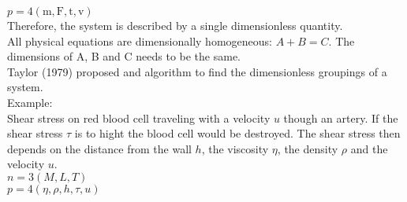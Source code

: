 \documentclass[hyperref]{labbook}
\numberwithin{equation}{experiment}
\numberwithin{table}{experiment}
\numberwithin{figure}{experiment}
\begin{document}
$p = 4 (\mathrm{m,F,t,v})$\\
Therefore, the system is described by a single dimensionless quantity.\\[1em]
All physical equations are dimensionally homogeneous: $A + B = C $. The dimensions of A, B and C needs to be the same. \\[1em]
Taylor (1979) proposed and algorithm to find the dimensionless groupings of a system. \\
Example:\\
Shear stress on red blood cell traveling with a velocity $u$ though an artery. If the shear stress $\tau$ is to hight the blood cell would be destroyed. The shear stress then depends on the distance from the wall $h$, the viscosity $\eta$, the density $\rho$ and the velocity $u$.\\[1em]
$n = 3 (M,L,T)$\\
$p = 4 (\eta,\rho,h,\tau,u)$\\
\end{document}
